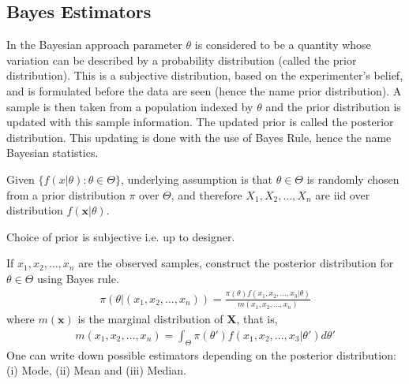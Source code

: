 \documentclass[a4paper,english,12pt]{article}
\begin{document}
\subsection{Bayes Estimators}
In the Bayesian approach parameter $\theta$ is considered to be a quantity whose variation can be described by a probability distribution (called the prior distribution). This is a subjective distribution, based on the experimenter's belief, and is formulated before the data are seen (hence the name prior distribution). A sample is then taken from a population indexed by $\theta$ and the prior distribution is updated with this sample information. The updated prior is called the posterior distribution. This updating is done with the use of Bayes Rule, hence the name Bayesian statistics.
\par Given $\{f(x|\theta):\theta \in \Theta\}$, underlying assumption is that $\theta \in \Theta$ is randomly chosen from a prior distribution $\pi$ over $\Theta$, and therefore $X_1,X_2,...,X_n$ are iid over distribution $f(\textbf{x}|\theta)$.
\begin{note}
 Choice of prior is subjective i.e. up to designer.
\end{note}
If $x_1,x_2,\dots,x_n$ are the observed samples, construct the posterior distribution for $\theta \in \Theta$ using Bayes rule.
\begin{align}
\pi(\theta|(x_1,x_2,\dots,x_n))=\frac{\pi(\theta)f(x_1,x_2,\dots,x_3|\theta)}{m(x_1,x_2,\dots,x_n)}
\end{align} 
where $m(\textbf{x})$ is the marginal distribution of $\textbf{X}$, that is,
\begin{align}
m(x_1,x_2,\dots,x_n)=\int_{\Theta}\pi(\theta')f(x_1,x_2,\dots,x_3|\theta')d\theta'
\end{align} 
One can write down possible estimators depending on the posterior distribution: (i) Mode, (ii) Mean and (iii) Median.
\end{document}
